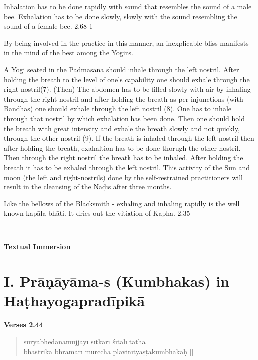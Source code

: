 
Inhalation has to be done rapidly with sound that resembles the sound of a male bee. Exhalation has to be done slowly, slowly with the sound resembling the sound of a female bee. 2.68-1


By being involved in the practice in this manner, an inexplicable bliss manifests in the mind of the best among the Yogins.


A Yogi seated in the Padmāsana should inhale through the left nostril. After holding the breath to the level of one’s capability one should exhale through the right nostril(7). (Then) The abdomen has to be filled slowly with air by inhaling through the right nostril and after holding the breath as per injunctions (with Bandhas) one should exhale through the left nostril (8). One has to inhale through that nostril by which exhalation has been done. Then one should hold the breath with great intensity and exhale the breath slowly and not quickly, through the other nostril (9).  If the breath is inhaled through the left nostril then after holding the breath, exahaltion has to be done thorugh the other nostril. Then through the right nostril the breath has to be inhaled. After holding the breath it has to be exhaled through the left nostril. This activity of the Sun and moon (the left and right-nostrils) done by the self-restrained practitioners will result in the cleansing of the Nāḍīs after three months. 


Like the bellows of the Blacksmith - exhaling and inhaling rapidly is the well known kapāla-bhāti. It dries out the vitiation of Kapha. 2.35
\newpage

\thispagestyle{empty}
~
\vfill
\begin{center}
\textbf{\Huge Textual Immersion}
\end{center}
\vfill
\eject

\section*{I. Prāṇāyāma-s (Kumbhakas) in Haṭhayogapradī\-pikā}

\noindent 
\textbf{Verses 2.44}

\begin{verse}
sūryabhedanamujjāyī sītkārī śītalī tathā |\\
bhastrikā bhrāmarī mūrcchā plāvinītyaṣṭakumbhakāḥ ||
\end{verse}

